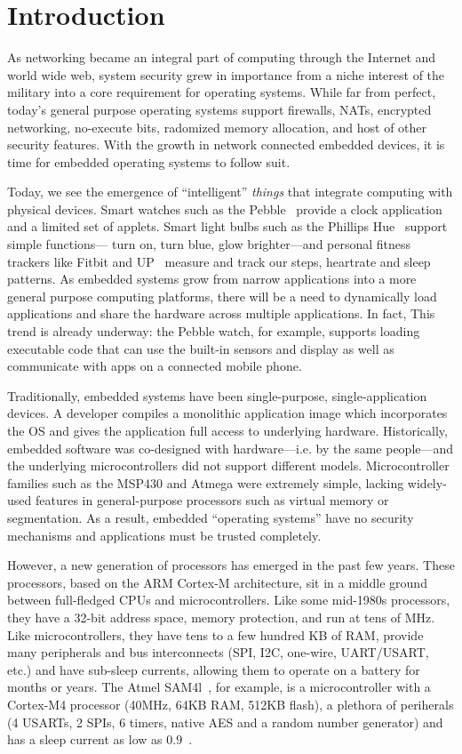 \section{Introduction}

As networking became an integral part of computing through the Internet and
world wide web, system security grew in importance from a niche interest of the
military into a core requirement for operating systems. While far from perfect,
today's general purpose operating systems support firewalls, NATs, encrypted
networking, no-execute bits, radomized memory allocation, and
host of other security features. With the growth in network connected embedded
devices, it is time for embedded operating systems to follow suit.

Today, we see the emergence of ``intelligent'' \textit{things} that integrate
computing with physical devices. Smart watches such as the Pebble~\cite{pebble}
provide a clock application and a limited set of applets. Smart light bulbs such
as the Phillips Hue~\cite{hue} support simple functions--- turn on, turn blue,
glow brighter---and personal fitness trackers like Fitbit and
UP~\cite{fitbit,jawboneup} measure and track our steps, heartrate and sleep
patterns. As embedded systems grow from narrow applications into a more general
purpose computing platforms, there will be a need to dynamically load
applications and share the hardware across multiple applications. In fact, This
trend is already underway: the Pebble watch, for example, supports loading
executable code that can use the built-in sensors and display as well as
communicate with apps on a connected mobile phone.


Traditionally, embedded systems have been single-purpose, single-application
devices. A developer compiles a monolithic application image which incorporates
the OS and gives the application full access to underlying hardware.
Historically, embedded software was co-designed with hardware---i.e. by the same
people---and the underlying microcontrollers did not support different models.
Microcontroller families such as the MSP430 and Atmega were extremely simple,
lacking widely-used features in general-purpose processors such as virtual
memory or segmentation. As a result, embedded ``operating systems'' have no
security mechanisms and applications must be trusted completely.

However, a new generation of processors has emerged in the past few years.
These processors, based on the ARM Cortex-M architecture, sit in a middle ground
between full-fledged CPUs and microcontrollers. Like some mid-1980s processors,
they have a 32-bit address space, memory protection, and run at tens of MHz.
Like microcontrollers, they have tens to a few hundred KB of RAM, provide many
peripherals and bus interconnects (SPI, I2C, one-wire, UART/USART, etc.) and
have sub-\uA sleep currents, allowing them to operate on a battery for
months or years. The Atmel SAM4l~\cite{sam4l}, for example, is a
microcontroller with a Cortex-M4 processor (40MHz, 64KB RAM, 512KB flash), a
plethora of periherals (4 USARTs, 2 SPIs, 6 timers, native AES and a random number
generator) and has a sleep current as low as $0.9$~\uA.

